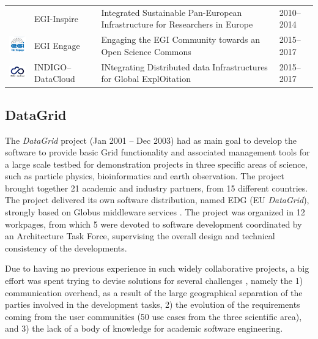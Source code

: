\documentclass[journal]{IEEEtran}
\begin{document}
\begin{table}[!h]
\begin{tabular}{p{1.6cm}p{1.5cm}p{3cm}l}
\begin{minipage}{.3\textwidth}
\end{minipage}
     & EGI-Inspire &
Integrated Sustainable Pan-European Infrastructure for Researchers in Europe
 & 2010--2014\\
\begin{minipage}{.3\textwidth}
\includegraphics[width=15mm,height=7.5mm]{images/egi_engage}
\end{minipage}
     & EGI Engage &
Engaging the EGI Community towards an Open Science Commons
 & 2015--2017\\
\begin{minipage}{.3\textwidth}
\includegraphics[width=15mm,height=7.5mm]{images/indigo}
\end{minipage}
     & INDIGO--DataCloud &
INtegrating Distributed data Infrastructures for Global ExplOitation
 & 2015--2017\\
\hline
\hline
\end{tabular}
\end{table}

\subsection{DataGrid}

The {\sl DataGrid} \cite{cordis:datagrid} project (Jan 2001 -- Dec 2003) 
had as main goal to develop the software to provide basic Grid functionality
and associated management tools for a large scale testbed for demonstration projects in three
specific areas of science, such as particle physics, bioinformatics and earth observation.
The project brought together 21 academic and industry partners, from 15 different
countries. 
The project delivered its own software distribution, named EDG (EU {\sl DataGrid}), strongly 
based on Globus middleware services \cite{globus}. The project was organized in 12 workpages, from 
which 5 were devoted to software development coordinated by an 
Architecture Task Force, supervising the overall design and technical consistency 
of the developments.

Due to having no previous experience in such widely
collaborative projects, a big effort was spent trying to devise solutions for several
challenges \cite{datagrid}, namely the 1) communication overhead, as a
result of the large geographical separation of the parties involved in the
development tasks, 2) the evolution of the requirements coming from the user
communities (50 use cases from the three scientific area), and 3) the lack of a body 
of knowledge for academic software engineering.
\end{document}
